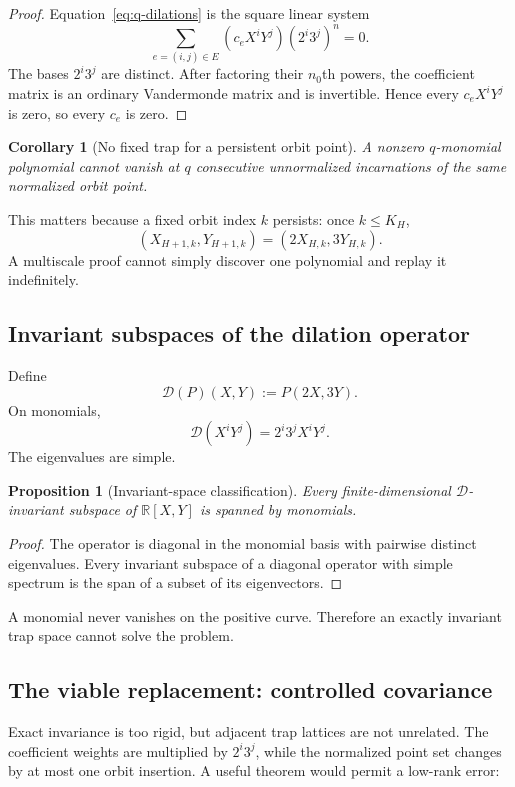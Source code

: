 \documentclass[11pt,oneside]{article}
\newtheorem{proposition}[theorem]{Proposition}
\newtheorem{corollary}[theorem]{Corollary}
\theoremstyle{definition}
\theoremstyle{remark}
\newcommand{\R}{\mathbb R}
\begin{document}
\begin{proof}
Equation~\eqref{eq:q-dilations} is the square linear system
\[
 \sum_{e=(i,j)\in E}(c_eX^iY^j)(2^i3^j)^n=0.
\]
The bases $2^i3^j$ are distinct.  After factoring their $n_0$th powers, the coefficient matrix
is an ordinary Vandermonde matrix and is invertible.  Hence every $c_eX^iY^j$ is zero, so every
$c_e$ is zero.
\end{proof}

\begin{corollary}[No fixed trap for a persistent orbit point]
A nonzero $q$-monomial polynomial cannot vanish at $q$ consecutive unnormalized incarnations
of the same normalized orbit point.
\end{corollary}

This matters because a fixed orbit index $k$ persists: once $k\le K_H$,
\[
 (X_{H+1,k},Y_{H+1,k})=(2X_{H,k},3Y_{H,k}).
\]
A multiscale proof cannot simply discover one polynomial and replay it indefinitely.

\subsection{Invariant subspaces of the dilation operator}

Define
\[
 \mathscr D(P)(X,Y):=P(2X,3Y).
\]
On monomials,
\[
 \mathscr D(X^iY^j)=2^i3^jX^iY^j.
\]
The eigenvalues are simple.

\begin{proposition}[Invariant-space classification]
\label{prop:invariant-spaces}
Every finite-dimensional $\mathscr D$-invariant subspace of $\R[X,Y]$ is spanned by
monomials.
\end{proposition}

\begin{proof}
The operator is diagonal in the monomial basis with pairwise distinct eigenvalues.  Every
invariant subspace of a diagonal operator with simple spectrum is the span of a subset of its
eigenvectors.
\end{proof}

A monomial never vanishes on the positive curve.  Therefore an exactly invariant trap space
cannot solve the problem.

\subsection{The viable replacement: controlled covariance}

Exact invariance is too rigid, but adjacent trap lattices are not unrelated.  The coefficient
weights are multiplied by $2^i3^j$, while the normalized point set changes by at most one
orbit insertion.  A useful theorem would permit a low-rank error:
\end{document}

